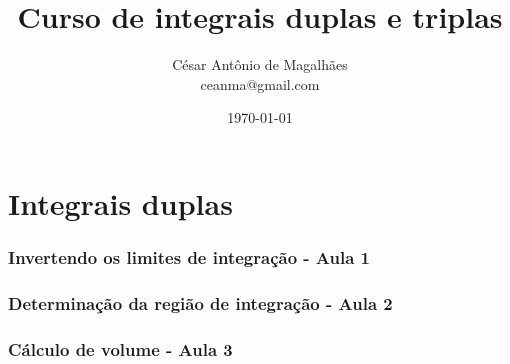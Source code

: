 \documentclass[12pt, a4paper]{article}
\title{Curso de integrais duplas e triplas}
\author{César Antônio de Magalhães \\ ceanma@gmail.com}
\date{\today}
\begin{document}
	\maketitle\newpage
	
	\tableofcontents\newpage
	
	
	\listoffigures\newpage
	
	
	\part{Integrais duplas}	
		\section{Invertendo os limites de integração - Aula 1}			
					
		\section{Determinação da região de integração - Aula 2}		
					
		\section{Cálculo de volume - Aula 3}
			
		
		
		
		
		
\end{document}
